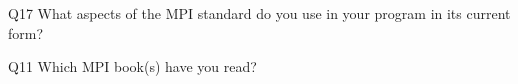 \begin{description}%
\item{Q17} What aspects of the MPI standard do you use in your program in its current form?%
\item{Q11} Which MPI book(s) have you read?%
\end{description}%
